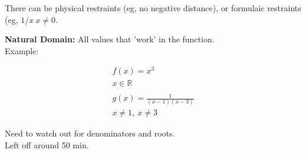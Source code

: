 \documentclass{article}
\begin{document}
There can be physical restraints (eg, no negative distance), or formulaic restraints (eg,
$1/x~x \neq 0$.

\textbf{Natural Domain:} All values that 'work' in the function.\\

Example:


\begin{align*}
f(x) = x^3\\
x \in \mathbb{R}\\
\\
g(x) = \frac{1}{(x-1)(x-3)}\\
x \neq 1,~x \neq 3
\end{align*}

Need to watch out for denominators and roots.\\

Left off around 50 min.
\end{document}
